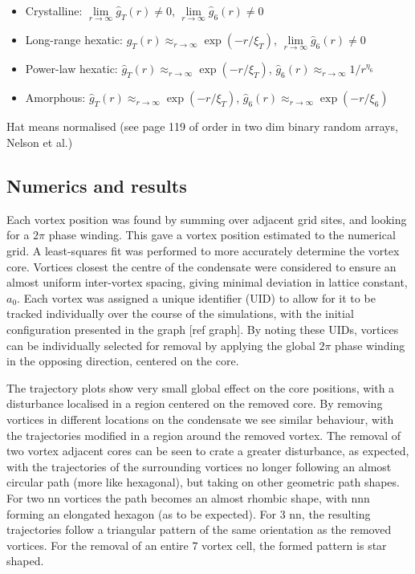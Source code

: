 \begin{itemize}
\item Crystalline: $\lim\limits_{r\rightarrow \infty}\hat{g}_T(r) \neq 0$, $\lim\limits_{r\rightarrow \infty}\hat{g}_6(r) \neq 0$
\item Long-range hexatic: $\hat{g}_T(r) \approx _{r\rightarrow \infty} \exp(-r/\xi_T) $, $\lim\limits_{r\rightarrow \infty}\hat{g}_6(r) \neq 0$
\item Power-law hexatic: $\hat{g}_T(r) \approx _{r\rightarrow \infty} \exp(-r/\xi_T) $, $\hat{g}_6(r) \approx _{r\rightarrow \infty} 1/r^{\eta_6}$
\item Amorphous: $\hat{g}_T(r) \approx _{r\rightarrow \infty} \exp(-r/\xi_T) $, $\hat{g}_6(r) \approx _{r\rightarrow \infty} \exp(-r/\xi_6) $
\end{itemize}
Hat means normalised (see page 119 of order in two dim binary random arrays, Nelson et al.)


\subsection{Numerics and results}\label{sec:numerics}

Each vortex position was found by summing over adjacent grid sites, and looking for a $2\pi$ phase winding. This gave a vortex position
estimated to the numerical grid. A least-squares fit was performed to more accurately determine the vortex core. Vortices closest the centre
of the condensate were considered to ensure an almost uniform inter-vortex spacing, giving minimal deviation in lattice constant, $a_0$. Each
vortex was assigned a unique identifier (UID) to allow for it to be tracked individually over the course of the simulations, with the initial
configuration presented in the graph [ref graph]. By noting these UIDs, vortices can be individually selected for removal by applying the
global $2\pi$ phase winding in the opposing direction, centered on the core.

The trajectory plots show very small global effect on the core positions, with a disturbance localised in a region centered on the removed
core. By removing vortices in different locations on the condensate we see similar behaviour, with the trajectories modified in a region
around the removed vortex. The removal of two vortex adjacent cores can be seen to crate a greater disturbance, as expected, with the
trajectories of the surrounding vortices no longer following an almost circular path (more like hexagonal), but taking on other geometric
path shapes. For two nn vortices the path becomes an almost rhombic shape, with nnn forming an elongated hexagon (as to be expected). For 3
nn, the resulting trajectories follow a triangular pattern of the same orientation as the removed vortices. For the removal of an entire 7
vortex cell, the formed pattern is star shaped.

